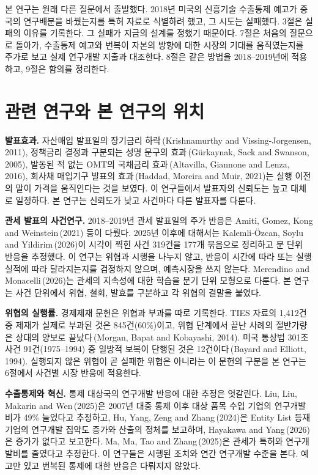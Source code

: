 \documentclass[11pt,a4paper]{article}
\begin{document}
본 연구는 원래 다른 질문에서 출발했다. 2018년 미국의 신흥기술 수출통제 예고가 중국의 연구배분을 바꿨는지를 특허 자료로 식별하려 했고, 그 시도는 실패했다. 3절은 실패의 이유를 기록한다. 그 실패가 지금의 설계를 정했기 때문이다. 7절은 처음의 질문으로 돌아가, 수출통제 예고와 번복이 자본의 방향에 대한 시장의 기대를 움직였는지를 주가로 보고 실제 연구개발 지출과 대조한다. 8절은 같은 방법을 2018--2019년에 적용하고, 9절은 함의를 정리한다.

\section{관련 연구와 본 연구의 위치}

\textbf{발표효과.} 자산매입 발표일의 장기금리 하락\,(Krishnamurthy and Vissing-Jorgensen, 2011), 정책금리 결정과 구분되는 성명 문구의 효과\,(Gürkaynak, Sack and Swanson, 2005), 발동된 적 없는 OMT의 국채금리 효과\,(Altavilla, Giannone and Lenza, 2016), 회사채 매입기구 발표의 효과\,(Haddad, Moreira and Muir, 2021)는 실행 이전의 말이 가격을 움직인다는 것을 보였다. 이 연구들에서 발표자의 신뢰도는 높고 대체로 일정하다. 본 연구는 신뢰도가 낮고 사건마다 다른 발표자를 다룬다.

\textbf{관세 발표의 사건연구.} 2018--2019년 관세 발표일의 주가 반응은 Amiti, Gomez, Kong and Weinstein\,(2021) 등이 다뤘다. 2025년 이후에 대해서는 Kalemli-Özcan, Soylu and Yildirim\,(2026)이 시각이 찍힌 사건 319건을 177개 묶음으로 정리하고 분 단위 반응을 추정했다. 이 연구는 위협과 시행을 나누지 않고, 반응이 시간에 따라 또는 실행 실적에 따라 달라지는지를 검정하지 않으며, 예측시장을 쓰지 않는다. Merendino and Monacelli\,(2026)는 관세의 지속성에 대한 학습을 분기 단위 모형으로 다룬다. 본 연구는 사건 단위에서 위협, 철회, 발효를 구분하고 각 위협의 결말을 붙였다.

\textbf{위협의 실행률.} 경제제재 문헌은 위협과 부과를 따로 기록한다. TIES 자료의 1,412건 중 제재가 실제로 부과된 것은 845건(60\%)이고, 위협 단계에서 끝난 사례의 절반가량은 상대의 양보로 끝났다\,(Morgan, Bapat and Kobayashi, 2014). 미국 통상법 301조 사건 91건(1975--1994) 중 일방적 보복이 단행된 것은 12건이다\,(Bayard and Elliott, 1994). 실행되지 않은 위협이 곧 실패한 위협은 아니라는 이 문헌의 구분을 본 연구는 6절에서 사건별 시장 반응에 적용한다.

\textbf{수출통제와 혁신.} 통제 대상국의 연구개발 반응에 대한 추정은 엇갈린다. Liu, Liu, Makarin and Wen\,(2025)은 2007년 대중 통제 이후 대상 품목 수입 기업의 연구개발비가 49\% 늘었다고 추정하고, Hu, Yang, Zeng and Zhang\,(2024)은 Entity List 등재 기업의 연구개발 집약도 증가와 산출의 정체를 보고하며, Hayakawa and Yang\,(2026)은 증가가 없다고 보고한다. Ma, Ma, Tao and Zhang\,(2025)은 관세가 특허와 연구개발비를 줄였다고 추정한다. 이 연구들은 시행된 조치와 연간 연구개발 수준을 본다. 예고만 있고 번복된 통제에 대한 반응은 다뤄지지 않았다.
\end{document}
